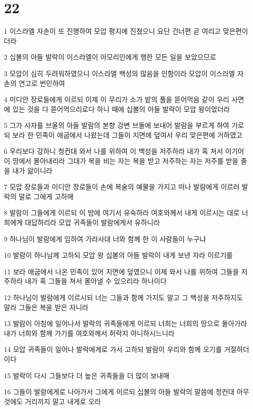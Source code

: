 \chapter{22}

\par 1 이스라엘 자손이 또 진행하여 모압 평지에 진쳤으니 요단 건너편 곧 여리고 맞은편이더라
\par 2 십볼의 아들 발락이 이스라엘이 아모리인에게 행한 모든 일을 보았으므로
\par 3 모압이 심히 두려워하였으니 이스라엘 백성의 많음을 인함이라 모압이 이스라엘 자손의 연고로 번민하여
\par 4 미디안 장로들에게 이르되 이제 이 무리가 소가 밭의 풀을 뜯어먹음 같이 우리 사면에 있는 것을 다 뜯어먹으리로다 하니 때에 십볼의 아들 발락이 모압 왕이었더라
\par 5 그가 사자를 브올의 아들 발람의 본향 강변 브돌에 보내어 발람을 부르게 하여 가로되 보라 한 민족이 애굽에서 나왔는데 그들이 지면에 덮여서 우리 맞은편에 거하였고
\par 6 우리보다 강하니 청컨대 와서 나를 위하여 이 백성을 저주하라 내가 혹 쳐서 이기어 이 땅에서 몰아내리라 그대가 복을 비는 자는 복을 받고 저주하는 자는 저주를 받을 줄을 내가 앎이니라
\par 7 모압 장로들과 미디안 장로들이 손에 복술의 예물을 가지고 떠나 발람에게 이르러 발락의 말로 그에게 고하매
\par 8 발람이 그들에게 이르되 이 밤에 여기서 유숙하라 여호와께서 내게 이르시는 대로 너희에게 대답하리라 모압 귀족들이 발람에게서 유하니라
\par 9 하나님이 발람에게 임하여 가라사대 너와 함께 한 이 사람들이 누구냐
\par 10 발람이 하나님께 고하되 모압 왕 십볼의 아들 발락이 내게 보낸 자라 이르기를
\par 11 보라 애굽에서 나온 민족이 있어 지면에 덮였으니 이제 와서 나를 위하여 그들을 저주하라 내가 혹 그들을 쳐서 몰아낼 수 있으리라 하나이다
\par 12 하나님이 발람에게 이르시되 너는 그들과 함께 가지도 말고 그 백성을 저주하지도 말라 그들은 복을 받은 자니라
\par 13 발람이 아침에 일어나서 발락의 귀족들에게 이르되 너희는 너희의 땅으로 돌아가라 내가 너희와 함께 가기를 여호와께서 허락지 아니하시느니라
\par 14 모압 귀족들이 일어나 발락에게로 가서 고하되 발람이 우리와 함께 오기를 거절하더이다
\par 15 발락이 다시 그들보다 더 높은 귀족들을 더 많이 보내매
\par 16 그들이 발람에게로 나아가서 그에게 이르되 십볼의 아들 발락의 말씀에 청컨대 아무 것에도 거리끼지 말고 내게로 오라
